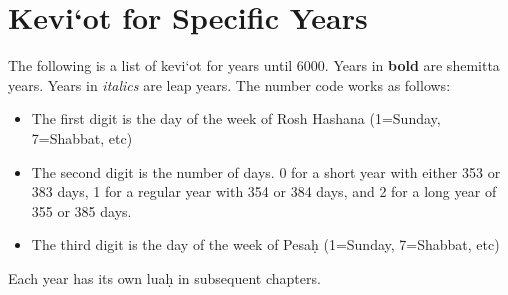 \chapter{Kevi`ot for Specific Years}

The following is a list of kevi`ot for years until 6000. Years in \textbf{bold} are shemitta years.  Years in \textit{italics} are leap years.  The number code works as follows:
\begin{itemize}
	\item The first digit is the day of the week of Rosh Hashana (1=Sunday, 7=Shabbat, etc)
	\item The second digit is the number of days. 0 for a short year with either 353 or 383 days, 1 for a regular year with 354 or 384 days, and 2 for a long year of 355 or 385 days.
	\item The third digit is the day of the week of Pesa\d{h} (1=Sunday, 7=Shabbat, etc)
\end{itemize}

Each year has its own lua\d{h} in subsequent chapters.\\

